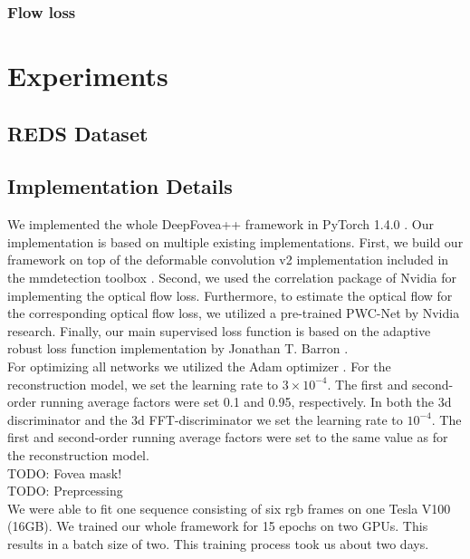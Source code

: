 \documentclass[10pt,twocolumn,letterpaper]{article}
\begin{document}
\subsubsection{Flow loss}

\section{Experiments} %

\subsection{REDS Dataset} %

\subsection{Implementation Details} %
We implemented the whole DeepFovea++ framework in PyTorch 1.4.0 \cite{pytorch}. Our implementation is based on multiple existing implementations. First, we build our framework on top of the deformable convolution v2 \cite{deformableconv} implementation included in the mmdetection toolbox \cite{mmdetection}. Second, we used the correlation package \cite{flownet2} of Nvidia for implementing the optical flow loss. Furthermore, to estimate the optical flow for the corresponding optical flow loss, we utilized a pre-trained PWC-Net \cite{pwcnet} by Nvidia research. Finally, our main supervised loss function is based on the adaptive robust loss function implementation by Jonathan T. Barron \cite{adaptiveroubustloss}.\\
For optimizing all networks we utilized the Adam optimizer \cite{adam}. For the reconstruction model, we set the learning rate to $3\times 10^{-4}$. The first and second-order running average factors were set 0.1 and 0.95, respectively. In both the 3d discriminator and the 3d FFT-discriminator we set the learning rate to $10^{-4}$. The first and second-order running average factors were set to the same value as for the reconstruction model.\\

TODO: Fovea mask!\\

TODO: Preprcessing\\

We were able to fit one sequence consisting of six rgb frames on one Tesla V100 (16GB). We trained our whole framework for 15 epochs on two GPUs. This results in a batch size of two. This training process took us about two days.
\end{document}
